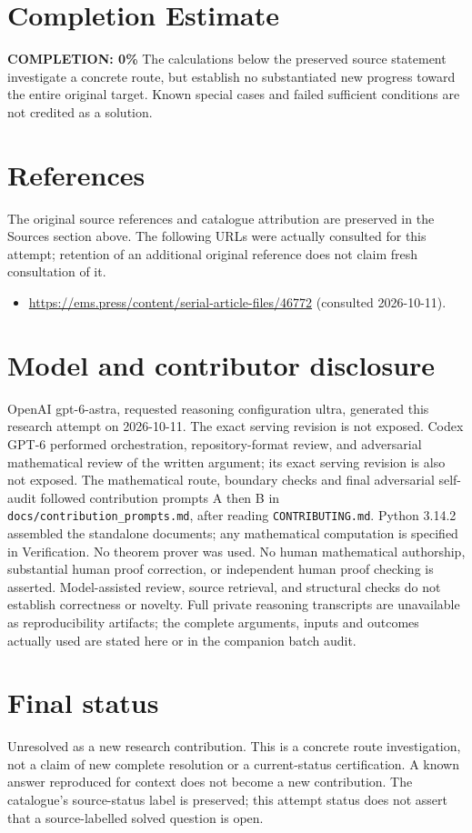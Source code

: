 \documentclass[11pt]{article}
\begin{document}
\section{Completion Estimate}
\noindent\textbf{COMPLETION: 0\%}
The calculations below the preserved source statement investigate a concrete route,
but establish no substantiated new progress toward the entire original target.
Known special cases and failed sufficient conditions are not credited as a solution.
\section{References}
The original source references and catalogue attribution are preserved in the
Sources section above. The following URLs were actually consulted for this attempt;
retention of an additional original reference does not claim fresh consultation of it.
\begin{itemize}
\item \url{https://ems.press/content/serial-article-files/46772} (consulted 2026-10-11). 
\end{itemize}
\section{Model and contributor disclosure}
OpenAI gpt-6-astra, requested reasoning configuration ultra, generated this research
attempt on 2026-10-11. The exact serving revision is not exposed. Codex GPT-6
performed orchestration, repository-format review, and adversarial mathematical review of the written argument; its exact serving revision
is also not exposed. The mathematical route, boundary checks and final adversarial
self-audit followed contribution prompts A then B in
\texttt{docs/contribution\_prompts.md}, after reading \texttt{CONTRIBUTING.md}.
Python 3.14.2 assembled the standalone documents; any mathematical computation is
specified in Verification. No theorem prover was used. No human mathematical
authorship, substantial human proof correction, or independent human proof checking
is asserted. Model-assisted review, source retrieval, and structural checks do not
establish correctness or novelty. Full private reasoning transcripts are unavailable
as reproducibility artifacts; the complete arguments, inputs and outcomes actually
used are stated here or in the companion batch audit.
\section{Final status}
Unresolved as a new research contribution. This is a concrete route investigation,
not a claim of new complete resolution or a current-status certification. A known
answer reproduced for context does not become a new contribution. The catalogue's
source-status label is preserved; this attempt status does not assert that a
source-labelled solved question is open.
\end{document}
